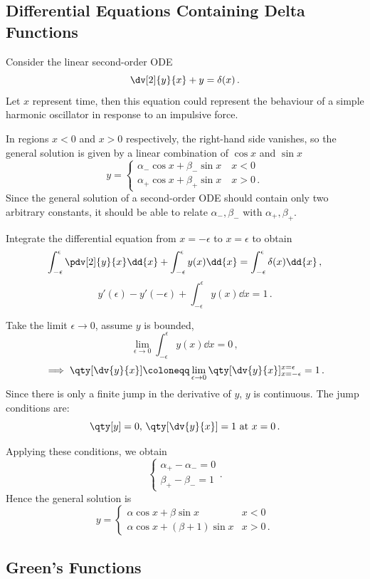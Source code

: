 \documentclass{article}
\theoremstyle{plain}\theoremheaderfont{\normalfont\itshape}\theorembodyfont{\rmfamily}\theoremseparator{.}\newtheorem*{rem}{Remark}\newtheorem*{ex}{Example}\newtheorem*{proof}{Proof}\newtheorem*{altp}{Alternative proof}
\theoremstyle{plain}\theoremheaderfont{\normalfont\bfseries}\theorembodyfont{\rmfamily}\theoremseparator{.}\newtheorem{thm}{Theorem}[section]\newtheorem{lem}[thm]{Lemma}\newtheorem{prop}[thm]{Proposition}\newtheorem*{cor}{Corollary}\newtheorem{defn}[thm]{Definition}\newtheorem{clm}[thm]{Claim}\newtheorem{clminproof}{Claim}
\theoremstyle{break}\theoremheaderfont{\normalfont\itshape}\theorembodyfont{\rmfamily}\theoremseparator{.\medskip}\newtheorem*{proofskip}{Proof}\newtheorem*{exs}{Examples}\newtheorem*{rems}{Remarks}
\theoremstyle{break}\theoremheaderfont{\normalfont\bfseries}\theorembodyfont{\rmfamily}\theoremseparator{.\medskip}\newtheorem{lemskip}[thm]{Lemma}\newtheorem{defnskip}[thm]{Definition}\newtheorem{propskip}[thm]{Proposition}\newtheorem{thmskip}[thm]{Theorem}
\numberwithin{equation}{section}
\begin{document}
	\subsection{Differential Equations Containing Delta Functions}
	Consider the linear second-order ODE
	\[\dv[2]{y}{x}+y=\delta(x)\,.\]
	Let \(x\) represent time, then this equation could represent the behaviour of a simple harmonic oscillator in response to an impulsive force.
	
	In regions \(x<0\) and \(x>0\) respectively, the right-hand side vanishes, so the general solution is given by a linear combination of \(\cos x\) and \(\sin x\)
	\[y=\begin{cases}
		\alpha_-\cos x+\beta_-\sin x \quad x<0\\
		\alpha_+\cos x+\beta_+\sin x \quad x>0\,.
	\end{cases}\]
	Since the general solution of a second-order ODE should contain only two arbitrary constants, it should be able to relate \(\alpha_-, \beta_-\) with \(\alpha_+,\beta_+\).
	
	Integrate the differential equation from \(x=-\epsilon\) to \(x=\epsilon\) to obtain
	\[\int_{-\epsilon}^{\epsilon}\pdv[2]{y}{x}\dd{x}+\int_{-\epsilon}^{\epsilon}y(x)\dd{x}=\int_{-\epsilon}^{\epsilon}\delta(x)\dd{x}\,,\]
	\[y'(\epsilon)-y'(-\epsilon)+\int_{-\epsilon}^{\epsilon}y(x)\dd{x}=1\,.\]
	
	Take the limit \(\epsilon\to 0\), assume \(y\) is bounded,
	\[\lim_{\epsilon\to 0}\int_{-\epsilon}^{\epsilon}y(x)\dd{x}=0\,,\]
	\[\implies\qty[\dv{y}{x}]\coloneqq\lim_{\epsilon\to 0}\qty[\dv{y}{x}]^{x=\epsilon}_{x=-\epsilon}=1\,.\]
	Since there is only a finite jump in the derivative of \(y\), \(y\) is continuous. The jump conditions are:
	\[\qty[y]=0,\, \qty[\dv{y}{x}]=1 \text{ at } x=0\,.\]
	
	Applying these conditions, we obtain
	\[\begin{cases}
		\alpha_+-\alpha_-=0\\
		\beta_+-\beta_-=1
	\end{cases}.\]
	Hence the general solution is
	\[y=\begin{cases}
		\alpha\cos x+\beta\sin x & x<0\\
		\alpha\cos x+(\beta+1)\sin x& x>0\,.
	\end{cases}\]
	
	\subsection{Green's Functions}
\end{document}
